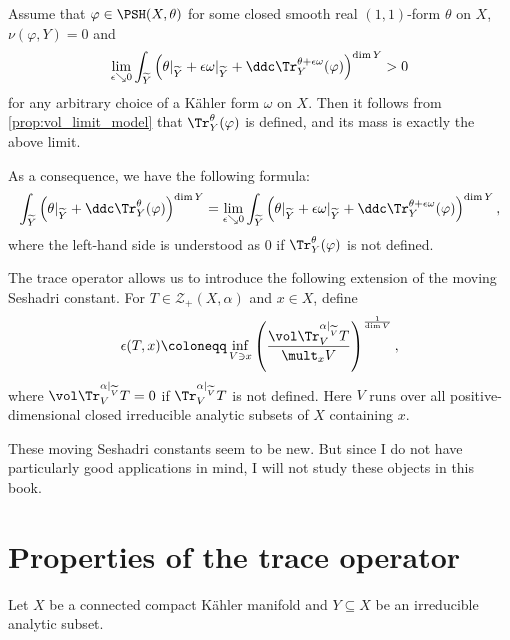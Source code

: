 \begin{example}\label{ex:tracedefinedposmass}
    Assume that $\varphi\in \PSH(X,\theta)$ for some closed smooth real $(1,1)$-form $\theta$ on $X$, $\nu(\varphi,Y)=0$ and
    \begin{equation}\label{eq:traceposmasscond}
    \lim_{\epsilon\searrow 0} \int_{\widetilde{Y}} \left( \theta|_{\widetilde{Y}} +\epsilon\omega|_{\widetilde{Y}}+\ddc\Tr_Y^{\theta+\epsilon\omega}(\varphi)\right)^{\dim Y} >0
    \end{equation}
    for any arbitrary choice of a Kähler form $\omega$ on $X$.
    Then it follows from \cref{prop:vol_limit_model} that $\Tr_Y^{\theta}(\varphi)$ is defined, and its mass is exactly the above limit.

    As a consequence, we have the following formula:
    \begin{equation}
        \int_{\widetilde{Y}} \left(\theta|_{\widetilde{Y}}+\ddc\Tr_Y^{\theta}(\varphi)\right)^{\dim Y}=\lim_{\epsilon\searrow 0} \int_{\widetilde{Y}} \left( \theta|_{\widetilde{Y}} +\epsilon\omega|_{\widetilde{Y}}+\ddc\Tr_Y^{\theta+\epsilon\omega}(\varphi)\right)^{\dim Y},
    \end{equation}
    where the left-hand side is understood as $0$ if $\Tr_Y^{\theta}(\varphi)$ is not defined.
\end{example}

\begin{remark}\label{rmk:movingSes}
    The trace operator allows us to introduce the following extension of the moving Seshadri constant. For $T\in \mathcal{Z}_+(X,\alpha)$ and $x\in X$, define
    \[
    \epsilon(T,x)\coloneqq \inf_{V\ni x}\left(\frac{\vol \Tr_V^{\alpha|_{\widetilde{V}}} T}{\mult_x V} \right)^{\frac{1}{\dim V}},
    \]
    where $\vol \Tr_V^{\alpha|_{\widetilde{V}}} T=0$ if $\Tr_V^{\alpha|_{\widetilde{V}}} T$ is not defined. Here $V$ runs over all positive-dimensional closed irreducible analytic subsets of $X$ containing $x$.

    These moving Seshadri constants seem to be new. But since I do not have particularly good applications in mind, I will not study these objects in this book.
\end{remark}

\section{Properties of the trace operator}\label{sec:proptrace}
Let $X$ be a connected compact Kähler manifold and $Y\subseteq X$ be an irreducible analytic subset.

